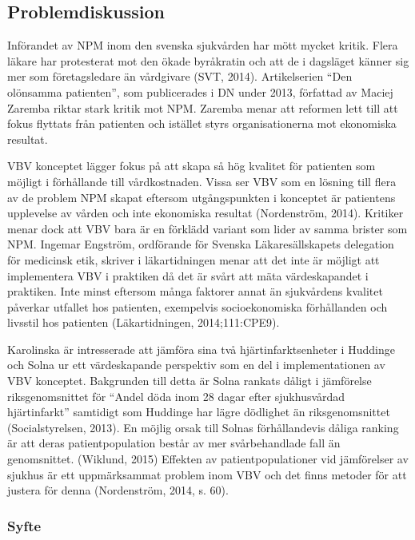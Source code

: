 \subsection{Problemdiskussion}

Införandet av NPM inom den svenska sjukvården har mött mycket kritik. Flera läkare har protesterat mot den ökade byråkratin och att de i dagsläget känner sig mer som företagsledare än vårdgivare (SVT, 2014). Artikelserien “Den olönsamma patienten”, som publicerades i DN under 2013, författad av Maciej Zaremba riktar stark kritik mot NPM. Zaremba menar att reformen lett till att fokus flyttats från patienten och istället styrs organisationerna mot ekonomiska resultat.
 
VBV konceptet lägger fokus på att skapa så hög kvalitet för patienten som möjligt i förhållande till vårdkostnaden. Vissa ser VBV som en lösning till flera av de problem NPM skapat eftersom utgångspunkten i konceptet är patientens upplevelse av vården och inte ekonomiska resultat (Nordenström, 2014). Kritiker menar dock att VBV bara är en förklädd variant som lider av samma brister som NPM. Ingemar Engström, ordförande för Svenska Läkaresällskapets delegation för medicinsk etik, skriver i läkartidningen menar att det inte är möjligt att implementera VBV i praktiken då det är svårt att mäta värdeskapandet i praktiken. Inte minst eftersom många faktorer annat än sjukvårdens kvalitet påverkar utfallet hos patienten, exempelvis socioekonomiska förhållanden och livsstil hos patienten (Läkartidningen, 2014;111:CPE9).
 
Karolinska är intresserade att jämföra sina två hjärtinfarktsenheter i Huddinge och Solna ur ett värdeskapande perspektiv som en del i implementationen av VBV konceptet. Bakgrunden till detta är Solna rankats dåligt i jämförelse riksgenomsnittet för “Andel döda inom 28 dagar efter sjukhusvårdad hjärtinfarkt” samtidigt som Huddinge har lägre dödlighet än riksgenomsnittet (Socialstyrelsen, 2013). En möjlig orsak till Solnas förhållandevis dåliga ranking är att deras patientpopulation består av mer svårbehandlade fall än genomsnittet. (Wiklund, 2015) Effekten av patientpopulationer vid jämförelser av sjukhus är ett uppmärksammat problem inom VBV och det finns metoder för att justera för denna (Nordenström, 2014, s. 60).


\subsubsection{Syfte}

